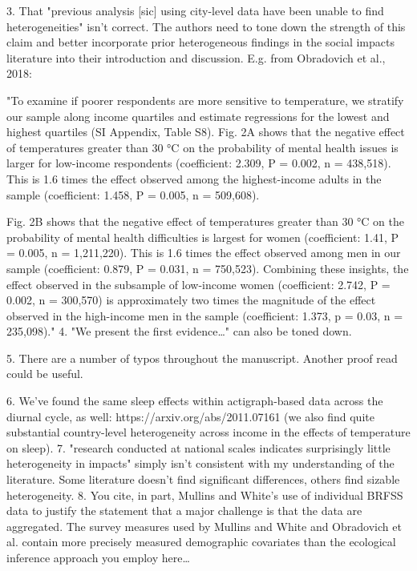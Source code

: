 3. That "previous analysis [sic] using city-level data have been unable to find heterogeneities" isn't correct. The authors need to tone down the strength of this claim and better incorporate prior heterogeneous findings in the social impacts literature into their introduction and discussion. E.g. from Obradovich et al., 2018:

"To examine if poorer respondents are more sensitive to temperature, we stratify our sample along income quartiles and estimate regressions for the lowest and highest quartiles (SI Appendix, Table S8). Fig. 2A shows that the negative effect of temperatures greater than 30 °C on the probability of mental health issues is larger for low-income respondents (coefficient: 2.309, P = 0.002, n = 438,518). This is 1.6 times the effect observed among the highest-income adults in the sample (coefficient: 1.458, P = 0.005, n = 509,608).

Fig. 2B shows that the negative effect of temperatures greater than 30 °C on the probability of mental health difficulties is largest for women (coefficient: 1.41, P = 0.005, n = 1,211,220). This is 1.6 times the effect observed among men in our sample (coefficient: 0.879, P = 0.031, n = 750,523). Combining these insights, the effect observed in the subsample of low-income women (coefficient: 2.742, P = 0.002, n = 300,570) is approximately two times the magnitude of the effect observed in the high-income men in the sample (coefficient: 1.373, p = 0.03, n = 235,098)."
4. "We present the first evidence…" can also be toned down.

5. There are a number of typos throughout the manuscript. Another proof read could be useful.

6. We've found the same sleep effects within actigraph-based data across the diurnal cycle, as well: https://arxiv.org/abs/2011.07161 (we also find quite substantial country-level heterogeneity across income in the effects of temperature on sleep).
7. "research conducted at national scales indicates surprisingly little heterogeneity in impacts" simply isn't consistent with my understanding of the literature. Some literature doesn't find significant differences, others find sizable heterogeneity.
8. You cite, in part, Mullins and White's use of individual BRFSS data to justify the statement that a major challenge is that the data are aggregated. The survey measures used by Mullins and White and Obradovich et al. contain more precisely measured demographic covariates than the ecological inference approach you employ here…

